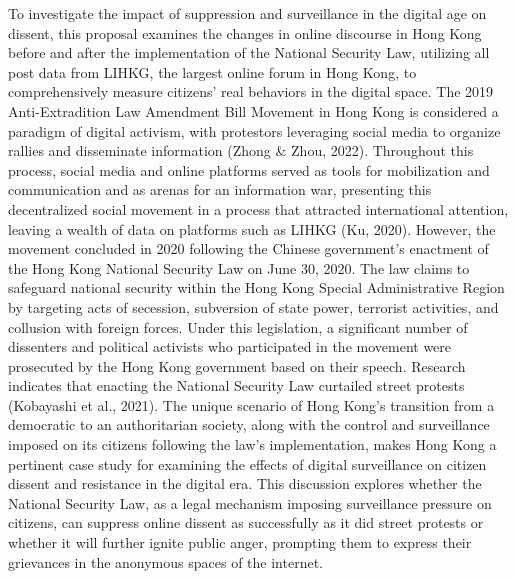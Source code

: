 \documentclass[12pt]{article}
\begin{document}
To investigate the impact of suppression and surveillance in the digital age on dissent, this proposal examines the changes in online discourse in Hong Kong before and after the implementation of the National Security Law, utilizing all post data from LIHKG, the largest online forum in Hong Kong, to comprehensively measure citizens' real behaviors in the digital space. The 2019 Anti-Extradition Law Amendment Bill Movement in Hong Kong is considered a paradigm of digital activism, with protestors leveraging social media to organize rallies and disseminate information (Zhong \& Zhou, 2022). Throughout this process, social media and online platforms served as tools for mobilization and communication and as arenas for an information war, presenting this decentralized social movement in a process that attracted international attention, leaving a wealth of data on platforms such as LIHKG (Ku, 2020). However, the movement concluded in 2020 following the Chinese government's enactment of the Hong Kong National Security Law on June 30, 2020. The law claims to safeguard national security within the Hong Kong Special Administrative Region by targeting acts of secession, subversion of state power, terrorist activities, and collusion with foreign forces. Under this legislation, a significant number of dissenters and political activists who participated in the movement were prosecuted by the Hong Kong government based on their speech. Research indicates that enacting the National Security Law curtailed street protests (Kobayashi et al., 2021). The unique scenario of Hong Kong's transition from a democratic to an authoritarian society, along with the control and surveillance imposed on its citizens following the law's implementation, makes Hong Kong a pertinent case study for examining the effects of digital surveillance on citizen dissent and resistance in the digital era. This discussion explores whether the National Security Law, as a legal mechanism imposing surveillance pressure on citizens, can suppress online dissent as successfully as it did street protests or whether it will further ignite public anger, prompting them to express their grievances in the anonymous spaces of the internet.

\nocite{*}
\printbibliography
\end{document}
